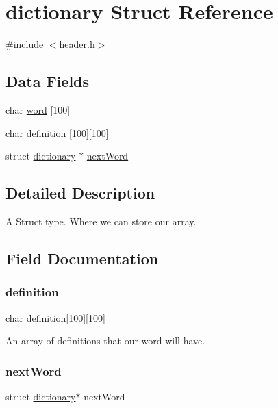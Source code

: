 \hypertarget{structdictionary}{}\section{dictionary Struct Reference}
\label{structdictionary}


{\ttfamily \#include $<$header.\+h$>$}

\subsection*{Data Fields}
\begin{DoxyCompactItemize}
\item 
char \hyperlink{structdictionary_ae8e3e053e32bc6c0ab4a48ba064bb994}{word} \mbox{[}100\mbox{]}
\item 
char \hyperlink{structdictionary_a5f753f588f8aeac1f75b64219ccae640}{definition} \mbox{[}100\mbox{]}\mbox{[}100\mbox{]}
\item 
struct \hyperlink{structdictionary}{dictionary} $\ast$ \hyperlink{structdictionary_a52f37ebc8f6e5a5e354a45f73ea69516}{next\+Word}
\end{DoxyCompactItemize}


\subsection{Detailed Description}
A Struct type. Where we can store our array. 

\subsection{Field Documentation}
\mbox{\label{structdictionary_a5f753f588f8aeac1f75b64219ccae640}} 
\subsubsection{\texorpdfstring{definition}{definition}}
{\footnotesize\ttfamily char definition\mbox{[}100\mbox{]}\mbox{[}100\mbox{]}}

An array of definitions that our word will have. \mbox{\label{structdictionary_a52f37ebc8f6e5a5e354a45f73ea69516}} 
\subsubsection{\texorpdfstring{next\+Word}{nextWord}}
{\footnotesize\ttfamily struct \hyperlink{structdictionary}{dictionary}$\ast$ next\+Word}

